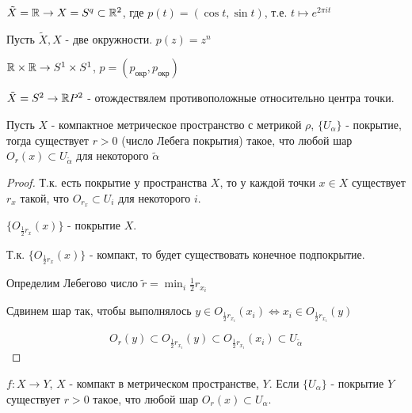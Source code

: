 \begin{example}
    $\tilde{X} = \mathbb{R} \rightarrow X = S^q \subset \mathbb{R}^2$, где $p(t) = (\cos t, \sin t)$, т.е. $t \mapsto e^{2\pi i t}$
\end{example}

\begin{example}
    Пусть $\tilde{X}, X$ - две окружности. $p(z) = z^n$
\end{example}

\begin{example}
    $\mathbb{R} \times \mathbb{R} \to S^1 \times S^1$, $p = (p_{\text{окр}}, p_{\text{окр}})$
\end{example}

\begin{example}
    $\tilde{X} = S^2 \rightarrow \mathbb{R} P^2$ - отождествялем противоположные относительно центра точки.
\end{example}

\begin{lemma}[Лебега]
    Пусть $X$ - компактное метрическое пространство с метрикой $\rho$, $\{U_{\alpha}\}$ - покрытие, тогда существует $r > 0$ (число Лебега покрытия) такое, что любой шар $O_r(x) \subset U_{\tilde{\alpha}}$ для некоторого $\tilde{\alpha}$
\end{lemma}
\begin{proof}
    Т.к. есть покрытие у пространства $X$, то у каждой точки $x \in X$ существует $r_x $ такой, что $O_{r_x} \subset U_i$ для некоторого $i$.

    \begin{statement}
        $\{O_{\frac{1}{2}r_x}(x)\}$ - покрытие $X$.
    \end{statement}

    Т.к. $\{O_{\frac{1}{2}r_x}(x)\}$ - компакт, то будет существовать конечное подпокрытие.

    Определим Лебегово число $\tilde{r} = \min_i \frac{1}{2}r_{x_i}$

    Сдвинем шар так, чтобы выполнялось $y \in O_{\frac{1}{2}r_{x_i}}(x_i) \Leftrightarrow x_i \in O_{\frac{1}{2}r_{x_i}}(y)$

    \[
        O_r(y) \subset O_{\frac{1}{2}r_{x_i}}(y) \subset O_{\frac{1}{2}r_{x_i}}(x_i) \subset U_{\tilde{\alpha}}
    \]
\end{proof}

\begin{theorem}[Следствие]
    $f:X \rightarrow Y$, $X$ - компакт в метрическом пространстве, $Y$. Если $\{U_{\alpha}\}$ - покрытие $Y$ существует $r > 0$ такое, что любой шар $O_r(x) \subset U_{\alpha}$.
\end{theorem}

